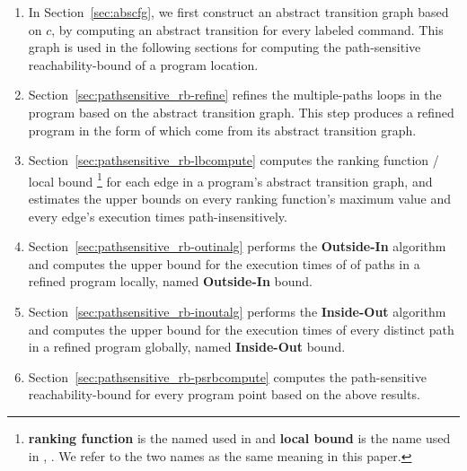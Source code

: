 \begin{enumerate}
\item  In Section~\ref{sec:abscfg}, we first construct an abstract transition graph based on $c$, by computing an abstract transition 
for every labeled command. 
This graph is used in the following sections
for computing the path-sensitive reachability-bound of a program location.
\item Section~\ref{sec:pathsensitive_rb-refine}
refines the multiple-paths loops in the program
based on the abstract transition graph. This step produces a refined program in the form of  which come from its abstract transition graph.
\item Section~\ref{sec:pathsensitive_rb-lbcompute} computes the ranking function / local bound
\footnote{\textbf{ranking function} is the named used in \cite{SinnZV14}
and \textbf{local bound} is the name used in \cite{ZulegerGSV11}, \cite{sinn2017complexity}.
We refer to the two names as the same meaning in this paper.} for each edge in a program's abstract transition graph,
and estimates the upper bounds on every ranking function's maximum value and every edge's execution times path-insensitively.
\item Section~\ref{sec:pathsensitive_rb-outinalg} performs the \textbf{Outside-In} algorithm and computes
the upper bound for the execution times of  of paths in a refined program locally, named \textbf{Outside-In} bound.
\item Section~\ref{sec:pathsensitive_rb-inoutalg} performs the \textbf{Inside-Out} algorithm and 
computes the upper bound for the execution times of
every distinct path in a refined program globally, named \textbf{Inside-Out} bound.
\item Section~\ref{sec:pathsensitive_rb-psrbcompute} computes the path-sensitive reachability-bound for every program point
based on the above results.
\end{enumerate}

